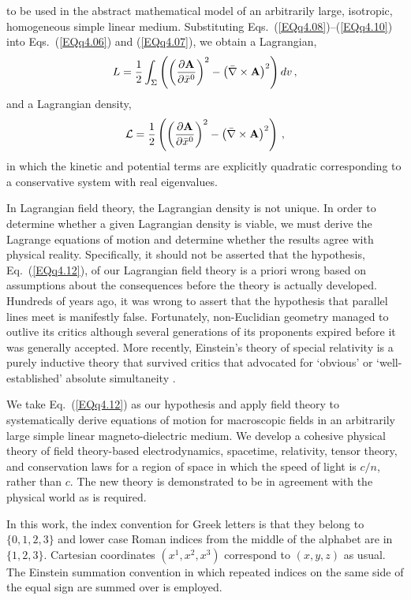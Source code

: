\documentclass[twocolumn,amssymb,eqsecnum,aps,pra]{revtex4-2}
\begin{document}
to be used in the abstract mathematical model of an arbitrarily large,
isotropic, homogeneous simple linear medium.
Substituting Eqs.~(\ref{EQq4.08})--(\ref{EQq4.10}) into
Eqs.~(\ref{EQq4.06}) and (\ref{EQq4.07}), we obtain a Lagrangian,
\begin{equation}
L=\frac{1}{2} \int_{\Sigma} 
\left ( \left (
\frac{\partial{\bf A}}{\partial \bar x^0}
\right )^2
- \left (\bar \nabla\times{\bf A} \right )^2
\right )
dv \, ,
\label{EQq4.11}
\end{equation}
and a Lagrangian density,
\begin{equation}
{\cal L}=\frac{1}{2} \left (
\left (
\frac{\partial{\bf A}}{\partial \bar x^0}
\right )^2
- \left (\bar \nabla\times{\bf A} \right )^2
\right ) \, ,
\label{EQq4.12}
\end{equation}
in which the kinetic and potential terms are
explicitly quadratic corresponding to a conservative system with real
eigenvalues.
\par
In Lagrangian field theory, the Lagrangian density is not unique. 
In order to determine whether a given Lagrangian density is viable,
we must derive the Lagrange equations of motion and determine whether
the results agree with physical reality.
Specifically, it should not be asserted that the hypothesis,
Eq.~(\ref{EQq4.12}), of our Lagrangian field theory is a priori wrong
based on assumptions about the consequences before the theory is
actually developed.
Hundreds of years ago, it was wrong to assert that the hypothesis that
parallel lines meet is manifestly false.
Fortunately, non-Euclidian geometry managed to outlive its critics
although several generations of its proponents expired before it was
generally accepted.
More recently, Einstein's theory of special relativity is a purely
inductive theory that survived critics that advocated for `obvious'
or `well-established' absolute simultaneity \cite{BIEhrenfestQuote}.
\par
We take Eq.~(\ref{EQq4.12}) as our hypothesis and apply 
field theory to systematically derive equations of motion for 
macroscopic fields in an arbitrarily large simple linear
magneto-dielectric medium.
We develop a cohesive physical theory of field theory-based
electrodynamics, spacetime, relativity, tensor theory, and conservation
laws for a region of space in which the speed of light is $c/n$, rather
than $c$.
The new theory is demonstrated to be in agreement with the physical
world as is required.
\par
In this work, the index convention for Greek letters is that they belong
to $\{0,1,2,3\}$ and lower case Roman indices from the middle of the 
alphabet are in $\{1,2,3\}$. 
Cartesian coordinates $(x^1,x^2,x^3)$ correspond to $(x,y,z)$ as usual.
The Einstein summation convention in which repeated indices on the
same side of the equal sign are summed over is employed.
\par
\end{document}
